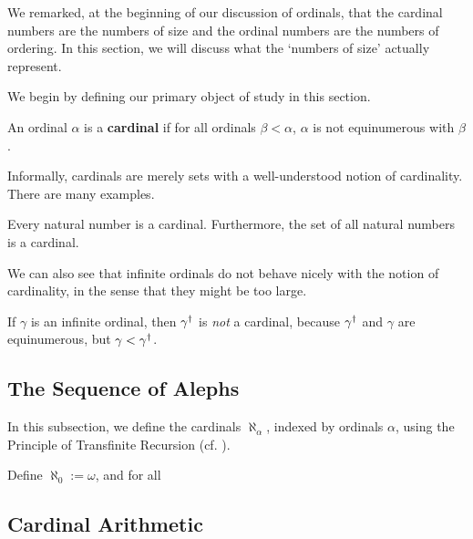 We remarked, at the beginning of our discussion of ordinals, that the cardinal numbers are the numbers of size and the ordinal numbers are the numbers of ordering. In this section, we will discuss what the `numbers of size' actually represent.

We begin by defining our primary object of study in this section.

\begin{boxdefinition}[Cardinal]
    An ordinal $\alpha$ is a \textbf{cardinal} if for all ordinals $\beta < \alpha$, $\alpha$ is not equinumerous with $\beta$.
\end{boxdefinition}

Informally, cardinals are merely sets with a well-understood notion of cardinality. There are many examples.

\begin{boxexample}
    Every natural number is a cardinal. Furthermore, the set of all natural numbers is a cardinal.
\end{boxexample}

We can also see that infinite ordinals do not behave nicely with the notion of cardinality, in the sense that they might be too large.

\begin{boxnexample}
    If $\gamma$ is an infinite ordinal, then $\gamma^{\dagger}$ is \textit{not} a cardinal, because $\gamma^{\dagger}$ and $\gamma$ are equinumerous, but $\gamma < \gamma^{\dagger}$.
\end{boxnexample}

\subsection{The Sequence of Alephs}

In this subsection, we define the cardinals $\aleph_{\alpha}$, indexed by ordinals $\alpha$, using the Principle of Transfinite Recursion (cf. ).

\begin{boxdefinition}\label{Ch3:Def:Alephs}
    Define $\aleph_0 := \omega$, and for all 
    \sorry
\end{boxdefinition}

\sorry

\subsection{Cardinal Arithmetic}

